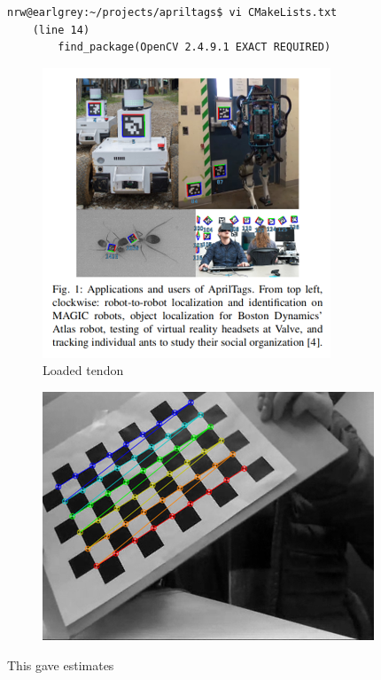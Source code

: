 \documentclass[12pt]{article}
\begin{document}
\begin{lstlisting}
nrw@earlgrey:~/projects/apriltags$ vi CMakeLists.txt 
    (line 14)
        find_package(OpenCV 2.4.9.1 EXACT REQUIRED)
\end{lstlisting}

\begin{figure}[H]
\centering
\includegraphics[width=.8\textwidth]{images/april/applications_april.png}
\caption{Loaded tendon}
\end{figure}

\begin{figure}[H]
\centering
\includegraphics[width=.8\textwidth]{images/april/webcam_calibration.png}
\end{figure}

This gave estimates
\end{document}

